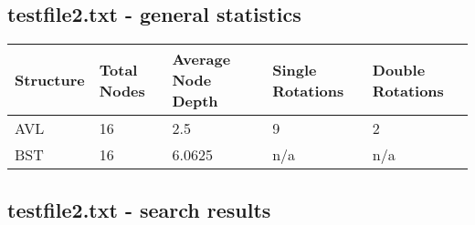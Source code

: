 \documentclass{article} %
\begin{document}
\subsection*{testfile2.txt - general statistics}
\begin{tabular}{|l|l|l|l|l|}
\hline
Structure & Total Nodes & Average Node Depth & Single Rotations & Double Rotations \\ \hline
AVL       & 16          & 2.5                & 9                & 2                \\ \hline
BST       & 16          & 6.0625             & n/a              & n/a              \\ \hline
\end{tabular}
\subsection*{testfile2.txt - search results}
\end{document}
